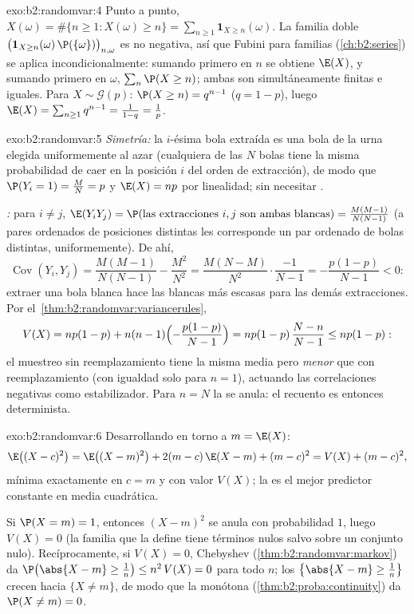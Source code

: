 \begin{solution}{exo:b2:randomvar:4}
Punto a punto, $X(\omega) = \#\{n \geq 1 : X(\omega) \geq n\} =
\sum_{n\geq1}\mathbf{1}_{X \geq n}(\omega)$. La familia doble
$\bigl(\mathbf{1}_{X \geq n}(\omega)\,\P(\{\omega\})\bigr)_{n,
\omega}$ es no negativa, así que Fubini para familias
(\cref{ch:b2:series}) se aplica incondicionalmente: sumando primero
en $n$ se obtiene $\E(X)$, y sumando primero en $\omega$, $\sum_n
\P(X \geq n)$; ambas son simultáneamente finitas e iguales. Para $X
\sim \mathcal{G}(p)$: $\P(X \geq n) = q^{n-1}$ ($q = 1-p$), luego
$\E(X) = \sum_{n\geq1}q^{n-1} = \frac{1}{1 - q} = \frac1p$.
\end{solution}

\begin{solution}{exo:b2:randomvar:5}
\emph{Simetría:} la $i$-ésima bola extraída es una bola de la urna
elegida uniformemente al azar (cualquiera de las $N$ bolas tiene la
misma probabilidad de caer en la posición $i$ del orden de
extracción), de modo que $\P(Y_i = 1) = \frac MN = p$ y $\E(X) = np$
por linealidad; sin necesitar .

\emph{:} para $i \neq j$, $\E(Y_iY_j) = \P(\text{las
extracciones } i, j \text{ son ambas blancas}) =
\frac{M(M-1)}{N(N-1)}$ (a pares ordenados de posiciones distintas les
corresponde un par ordenado de bolas distintas, uniformemente). De
ahí,
\[
\operatorname{Cov}(Y_i, Y_j)
= \frac{M(M-1)}{N(N-1)} - \frac{M^2}{N^2}
= \frac{M(N - M)}{N^2}\cdot\frac{-1}{N-1}
= -\frac{p(1-p)}{N-1} < 0 :
\]
extraer una bola blanca hace las blancas más escasas para las demás
extracciones. Por el~\cref{thm:b2:randomvar:variancerules},
\[
V(X) = np(1-p) + n(n-1)\Bigl(-\frac{p(1-p)}{N-1}\Bigr)
= np(1-p)\,\frac{N - n}{N - 1} \leq np(1-p) :
\]
el muestreo sin reemplazamiento tiene la misma media pero \emph{menor}
 que con reemplazamiento (con igualdad solo para $n = 1$),
actuando las correlaciones negativas como estabilizador. Para $n = N$
la  se anula: el recuento es entonces determinista.
\end{solution}

\begin{solution}{exo:b2:randomvar:6}
Desarrollando en torno a $m = \E(X)$:
\[
\E\bigl((X - c)^2\bigr)
= \E\bigl((X - m)^2\bigr) + 2(m - c)\,\E(X - m) + (m - c)^2
= V(X) + (m - c)^2 ,
\]
mínima exactamente en $c = m$ y con valor $V(X)$; la  es el
mejor predictor constante en media cuadrática.

Si $\P(X = m) = 1$, entonces $(X - m)^2$ se anula con probabilidad
$1$, luego $V(X) = 0$ (la familia que la define tiene términos nulos
salvo sobre un conjunto nulo). Recíprocamente, si $V(X) = 0$,
Chebyshev (\cref{thm:b2:randomvar:markov}) da $\P\bigl(\abs{X - m}
\geq \frac1n\bigr) \leq n^2\,V(X) = 0$ para todo $n$; los 
$\bigl\{\abs{X - m} \geq \frac1n\bigr\}$ crecen hacia $\{X \neq m\}$,
de modo que la  monótona
(\cref{thm:b2:proba:continuity}) da $\P(X \neq m) = 0$.
\end{solution}

